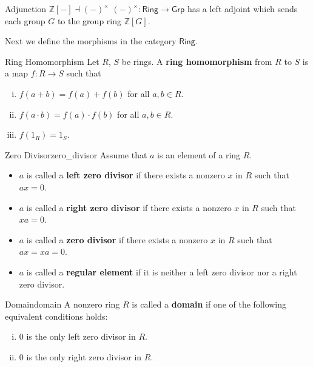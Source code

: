 \begin{proposition}{Adjunction $\mathbb{Z}\left[-\right]\dashv \left(-\right)^\times$}{}
    $(-)^\times:\mathsf{Ring}\to\mathsf{Grp}$ has a left adjoint which sends each group $G$ to the group ring $\mathbb{Z}\left[G\right]$.
\end{proposition}


Next we define the morphisms in the category $\mathsf{Ring}$.
\begin{definition}{Ring Homomorphism}{}
    Let $R$, $S$ be rings. A \textbf{ring homomorphism} from $R$ to $S$ is a map $f:R\to S$ such that
    \begin{enumerate}[(i)]
        \item $f(a+b)=f(a)+f(b)$ for all $a,b\in R$.
        \item $f(a\cdot b)=f(a)\cdot f(b)$ for all $a,b\in R$.
        \item $f(1_R)=1_S$.
    \end{enumerate}
\end{definition}




\begin{definition}{Zero Divisor}{zero_divisor}
    Assume that $a$ is an element of a ring $R$. 
    \begin{itemize}
        \item $a$ is called a \textbf{left zero divisor} if there exists a nonzero $x$ in $R$ such that $ax = 0$.
        \item $a$ is called a \textbf{right zero divisor} if there exists a nonzero $x$ in $R$ such that $xa = 0$.
        \item $a$ is called a \textbf{zero divisor} if there exists a nonzero $x$ in $R$ such that $ax = xa = 0$.
        \item $a$ is called a \textbf{regular element} if it is neither a left zero divisor nor a right zero divisor.
    \end{itemize}
\end{definition}

\begin{definition}{Domain}{domain}
    A nonzero ring $R$ is called a \textbf{domain} if one of the following equivalent conditions holds:
    \begin{enumerate}[(i)]
        \item 0 is the only left zero divisor in $R$.
        \item 0 is the only right zero divisor in $R$.
    \end{enumerate}
\end{definition}


